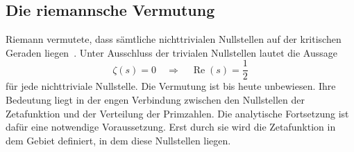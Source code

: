 %		
%		
%		
%		
%		
%		
%	
\subsection{Die riemannsche Vermutung}

Riemann vermutete, dass sämtliche nichttrivialen Nullstellen auf der kritischen Geraden liegen~\cite{hankel:riemann}. 
%
Unter Ausschluss der trivialen Nullstellen lautet die Aussage
\begin{equation}
\boxed{
\zeta(s)=0
\quad\Longrightarrow\quad
\operatorname{Re}(s)=\frac{1}{2}
}
\label{hankel:eq:riemannsche-vermutung}
\end{equation}
für jede nichttriviale Nullstelle. 
Die Vermutung ist bis heute unbewiesen.
Ihre Bedeutung liegt in der engen Verbindung zwischen den Nullstellen der Zetafunktion und der Verteilung der Primzahlen. 
%
Die analytische Fortsetzung ist dafür eine notwendige Voraussetzung.
Erst durch sie wird die Zetafunktion in dem Gebiet definiert, in dem diese Nullstellen liegen.

